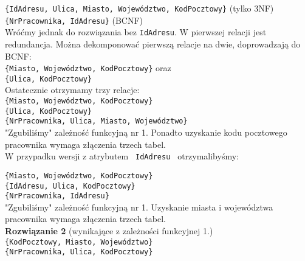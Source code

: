 \documentclass[a5paper,6pt]{article}
\begin{document}
    \texttt{\{{\color{red}\faKey}IdAdresu,
    {\color{green}\faKey}{\color{blue}\faKey}Ulica,
    {\color{green}\faKey}Miasto, {\color{green}\faKey}Województwo,
    {\color{green}\faKey}KodPocztowy\}}
    (tylko 3NF)\\
    \texttt{\{{\color{green}\faKey}NrPracownika, IdAdresu\}} (BCNF)\\

    Wróćmy jednak do rozwiązania bez \texttt{IdAdresu}. W pierwszej relacji jest
    redundancja. Można dekomponować pierwszą relacje na dwie, doprowadzają do
    BCNF:\\
    \texttt{\{Miasto, Województwo, {\color{blue}\faKey}KodPocztowy\}} oraz\\
    \texttt{\{{\color{green}\faKey}Ulica, {\color{green}\faKey}KodPocztowy\}}\\

    Ostatecznie otrzymamy trzy relacje:\\
    \texttt{\{Miasto, Województwo, {\color{blue}\faKey}KodPocztowy\}}\\
    \texttt{\{{\color{green}\faKey}Ulica, {\color{green}\faKey}KodPocztowy\}}\\
    \texttt{\{{\color{green}\faKey}NrPracownika, Ulica, Miasto, Województwo\}}\\

    "Zgubiliśmy" zależność funkcyjną nr 1. Ponadto uzyskanie kodu pocztowego
    pracownika wymaga złączenia trzech tabel.\\

    W przypadku wersji z atrybutem \texttt{ IdAdresu } otrzymalibyśmy:

    \texttt{\{Miasto, Województwo, {\color{blue}\faKey}KodPocztowy\}}\\
    \texttt{\{{\color{red}\faKey}IdAdresu, {\color{blue}\faKey}Ulica,
    {\color{blue}\faKey}KodPocztowy\}}\\
    \texttt{\{{\color{green}\faKey}NrPracownika, IdAdresu\}}\\

    "Zgubiliśmy" zależność funkcyjną nr 1. Uzyskanie miasta i województwa
    pracownika wymaga złączenia trzech tabel.\\

    \textbf{Rozwiązanie 2} (wynikające z zależności funkcyjnej 1.)\\

    \texttt{\{{\color{green}\faKey}KodPocztowy, Miasto, Województwo\}}\\
    \texttt{\{{\color{green}\faKey}NrPracownika, Ulica, KodPocztowy\}}\\
\end{document}

